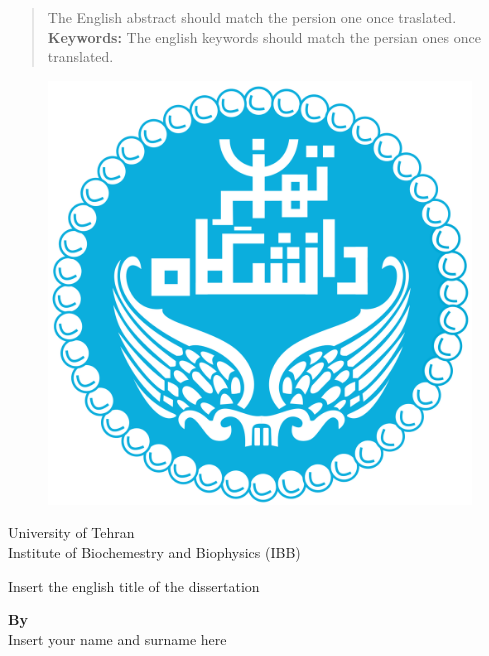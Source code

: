 \documentclass[12pt]{report}
\begin{document}
\begin{latin}
\begin{abstract}
The English abstract should match the persion one once traslated.\\[0.5cm]
\textbf{Keywords: } The english keywords should match the persian ones once translated. 
\end{abstract}
\newpage

\begin{figure}
\centering
\includegraphics[scale=0.1]{UT-Logo.png}
\end{figure}
\begin{center}
University of Tehran\\
Institute of Biochemestry and Biophysics (IBB)
\end{center}

\vfill

\begin{center}
\LARGE{Insert the english title of the dissertation}
\end{center}

\vfill

{\large \begin{center}
\textbf{
By\\
} Insert your name and surname here 
\end{center}

}
\end{latin}
\end{document}
